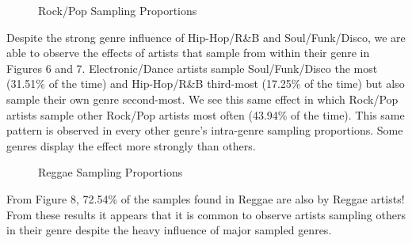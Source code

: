 \documentclass[pageno]{jpaper}
\begin{document}
\begin{figure}[H]
\centering
\caption{Electronic/Dance Sampling Proportions}\caption{Rock/Pop Sampling Proportions}
\label{fig:fig6}
\label{fig:fig7}
\end{figure}
Despite the strong genre influence of Hip-Hop/R\&B and Soul/Funk/Disco, we are able to observe the effects of artists that sample from within their genre in Figures 6 and 7. Electronic/Dance artists sample Soul/Funk/Disco the most (31.51\% of the time) and Hip-Hop/R\&B third-most (17.25\% of the time) but also sample their own genre second-most. We see this same effect in which Rock/Pop artists sample other Rock/Pop artists most often (43.94\% of the time). This same pattern is observed in every other genre's intra-genre sampling proportions. Some genres display the effect more strongly than others.
\begin{figure}[H]
\caption{Reggae Sampling Proportions}
\label{fig:fig8}
\centering
\end{figure}
From Figure 8, 72.54\% of the samples found in Reggae are also by Reggae artists!
From these results it appears that it is common to observe artists sampling others in their genre despite the heavy influence of major sampled genres. 
\end{document}
